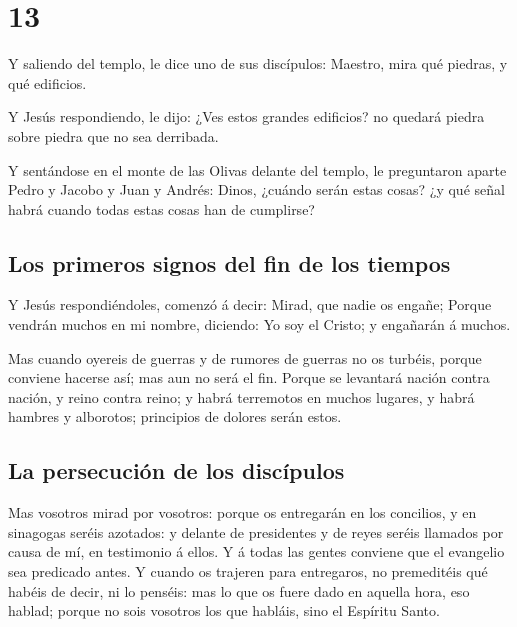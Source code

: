 \hypertarget{section-12}{%
\section{13}\label{section-12}}

 Y saliendo del templo, le dice uno de sus discípulos:
Maestro, mira qué piedras, y qué edificios.

 Y Jesús respondiendo, le dijo: ¿Ves estos grandes
edificios? no quedará piedra sobre piedra que no sea derribada.

 Y sentándose en el monte de las Olivas delante del
templo, le preguntaron aparte Pedro y Jacobo y Juan y Andrés:
 Dinos, ¿cuándo serán estas cosas? ¿y qué señal habrá
cuando todas estas cosas han de cumplirse?

\hypertarget{los-primeros-signos-del-fin-de-los-tiempos-1}{%
\subsection{Los primeros signos del fin de los
tiempos}\label{los-primeros-signos-del-fin-de-los-tiempos-1}}

 Y Jesús respondiéndoles, comenzó á decir: Mirad, que
nadie os engañe;  Porque vendrán muchos en mi nombre,
diciendo: Yo soy el Cristo; y engañarán á muchos.

 Mas cuando oyereis de guerras y de rumores de guerras no
os turbéis, porque conviene hacerse así; mas aun no será el fin.
 Porque se levantará nación contra nación, y reino contra
reino; y habrá terremotos en muchos lugares, y habrá hambres y
alborotos; principios de dolores serán estos.

\hypertarget{la-persecuciuxf3n-de-los-discuxedpulos}{%
\subsection{La persecución de los
discípulos}\label{la-persecuciuxf3n-de-los-discuxedpulos}}

 Mas vosotros mirad por vosotros: porque os entregarán en
los concilios, y en sinagogas seréis azotados: y delante de presidentes
y de reyes seréis llamados por causa de mí, en testimonio á ellos.
 Y á todas las gentes conviene que el evangelio sea
predicado antes.  Y cuando os trajeren para entregaros,
no premeditéis qué habéis de decir, ni lo penséis: mas lo que os fuere
dado en aquella hora, eso hablad; porque no sois vosotros los que
habláis, sino el Espíritu Santo.

